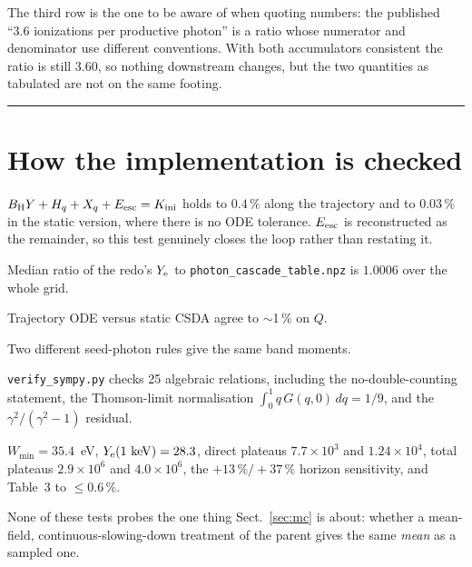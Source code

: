\documentclass[11pt,a4paper]{article}
\newcommand{\file}[1]{\texttt{\small #1}}
\newcommand{\BH}{B_{\mathrm{H}}}
\begin{document}
The third row is the one to be aware of when quoting numbers: the published
``3.6 ionizations per productive photon'' is a ratio whose numerator and
denominator use different conventions.  With both accumulators consistent the
ratio is still $3.60$, so nothing downstream changes, but the two quantities as
tabulated are not on the same footing.

\bigskip
\hrule

\section{How the implementation is checked}

\begin{description}[leftmargin=0pt,style=unboxed,itemsep=4pt]
\item[Energy closure.]  $\BH Y + H_q + X_q + E_{\rm esc} = K_{\rm ini}$ holds
      to $0.4\,\%$ along the trajectory and to $0.03\,\%$ in the static
      version, where there is no ODE tolerance.  $E_{\rm esc}$ is reconstructed
      as the remainder, so this test genuinely closes the loop rather than
      restating it.
\item[Table-vs-table.]  Median ratio of the redo's $Y_{\rm e}$ to
      \file{photon\_cascade\_table.npz} is $1.0006$ over the whole grid.
\item[Two independent methods.]  Trajectory ODE versus static CSDA agree to
      $\sim$1\,\% on $Q$.
\item[Quadrature independence.]  Two different seed-photon rules give the same
      band moments.
\item[Symbolic algebra.]  \file{verify\_sympy.py} checks 25 algebraic
      relations, including the no-double-counting statement, the Thomson-limit
      normalisation $\int_0^1 q\,G(q,0)\,dq = 1/9$, and the
      $\gamma^2/(\gamma^2-1)$ residual.
\item[Published numbers reproduced.]  $W_{\min} = 35.4$~eV,
      $Y_{\rm e}(1\ {\rm keV}) = 28.3$, direct plateaus $7.7\times10^3$ and
      $1.24\times10^4$, total plateaus $2.9\times10^6$ and $4.0\times10^6$,
      the $+13\,\%/+37\,\%$ horizon sensitivity, and Table~3 to $\le 0.6\,\%$.
\end{description}

None of these tests probes the one thing Sect.~\ref{sec:mc} is about: whether
a mean-field, continuous-slowing-down treatment of the parent gives the same
\emph{mean} as a sampled one.
\end{document}
